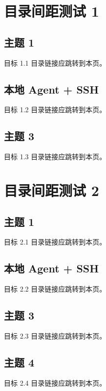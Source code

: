\documentclass[navigation=false]{campusbeamer}
\begin{document}
\section{目录间距测试 1}
\sectioncoverpage[primary]{}
\subsection{主题 1}
\begin{frame}{目标 1.1}
目录链接应跳转到本页。
\end{frame}
\subsection{本地 Agent + SSH}
\begin{frame}{目标 1.2}
目录链接应跳转到本页。
\end{frame}
\subsection{主题 3}
\begin{frame}{目标 1.3}
目录链接应跳转到本页。
\end{frame}
\section{目录间距测试 2}
\sectioncoverpage[primary]{}
\subsection{主题 1}
\begin{frame}{目标 2.1}
目录链接应跳转到本页。
\end{frame}
\subsection{本地 Agent + SSH}
\begin{frame}{目标 2.2}
目录链接应跳转到本页。
\end{frame}
\subsection{主题 3}
\begin{frame}{目标 2.3}
目录链接应跳转到本页。
\end{frame}
\subsection{主题 4}
\begin{frame}{目标 2.4}
目录链接应跳转到本页。
\end{frame}
\end{document}
